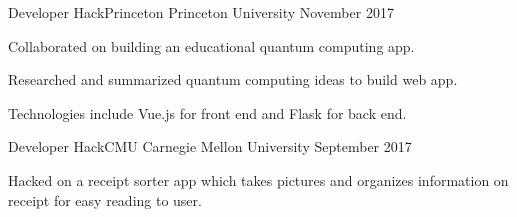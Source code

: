 \begin{cventries}
    
    \cventry
      {Developer}
      {HackPrinceton}
      {Princeton University}
      {November 2017}
      {
        \begin{cvitems}
            \item Collaborated on building an educational quantum computing app. 
            \item Researched and summarized quantum computing ideas to build web app.
            \item Technologies include Vue.js for front end and Flask for back end.
        \end{cvitems}
    }
    
    \cventry
      {Developer}
      {HackCMU}
      {Carnegie Mellon University}
      {September 2017}
      {
        \begin{cvitems}
            \item Hacked on a receipt sorter app which takes pictures and organizes information on receipt for easy reading to user.
        \end{cvitems}
    }
    
\end{cventries}
